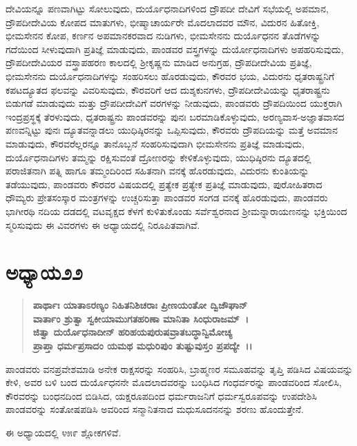 ದೇವಿಯನ್ನೂ ಪಣವಾಗಿಟ್ಟು ಸೋಲುವುದು, ದುರ್ಯೊಧನಾದಿಗಳಿಂದ ದ್ರೌಪದೀ ದೇವಿಗೆ ಸಭೆಯಲ್ಲಿ ಅಪಮಾನ, ದ್ರೌಪದೀದೇವಿಯ ಕೋಪದ ಮಾತುಗಳು, ಭೀಷ್ಮಾಚಾರ್ಯರೇ ಮೊದಲಾದವರ ಮೌನ, ವಿದುರನ ಹಿತೋಕ್ತಿ, ಭೀಮಸೇನನ ಕೋಪ, ಕರ್ಣನ ಅಪಮಾನಕರವಾದ ನುಡಿಗಳು, ಭೀಮಸೇನನು ದುರ್ಯೊಧನನ ತೊಡೆಗಳನ್ನು ಗದೆಯಿಂದ ಸೀಳುವುದಾಗಿ ಪ್ರತಿಜ್ಞೆ ಮಾಡುವುದು, ಪಾಂಡವರ ವಸ್ತ್ರಗಳನ್ನು ದುರ್ಯೋಧನಾದಿಗಳು ಅಪಹರಿಸುವುದು, ದ್ರೌಪದೀದೇವಿಯರ ವಸ್ತ್ರಾಪಹರಣ ಕಾಲದಲ್ಲಿ ಶ‍್ರೀಕೃಷ್ಣನು ಮಾಡಿದ ಅನುಗ್ರಹ, ದ್ರೌಪದೀದೇವಿಯ ಪ್ರತಿಜ್ಞೆ, ಭೀಮಸೇನನು ದುರ್ಯೊಧನಾದಿಗಳನ್ನು ಸಂಹರಿಸಲು ಹೊರಡುವುದು, ಕೌರವರ ಭಯ, ವಿದುರನು ಧೃತರಾಷ್ಟ್ರನಿಗೆ ಕಪಟ\-ದ್ಯೂತದ ಫಲವನ್ನು ವಿವರಿಸುವುದು, ಕೌರವರಿಗೆ ಆದ ದುಶ್ಶಕುನಗಳು, ದ್ರೌಪದೀದೇವಿಯನ್ನು ಧೃತರಾಷ್ಟ್ರನು ಬಿಡುಗಡೆ ಮಾಡುವುದು ಮತ್ತು ದ್ರೌಪದೀದೇವಿಗೆ ವರಗಳನ್ನು ನೀಡುವುದು, ಪಾಂಡವರು ದ್ರೌಪದಿಯಿಂದ ಯುಕ್ತರಾಗಿ ಇಂದ್ರಪ್ರಸ್ಥಕ್ಕೆ ತೆರಳುವುದು, ಧೃತರಾಷ್ಟ್ರನು ಪಾಂಡವರನ್ನು ಪುನಃ ಬರಮಾಡಿಕೊಳ್ಳುವುದು, ಅರಣ್ಯವಾಸ-ಅಜ್ಞಾತವಾಸದ ಪಣವನ್ನಿಟ್ಟು ಪುನಃ ದ್ಯೂತವನ್ನಾಡಲು ಯುಧಿಷ್ಠಿರನನ್ನು ಒಪ್ಪಿಸುವುದು, ಕೌರವರು ದ್ರೌಪದಿಯನ್ನು ಮತ್ತೆ ಅವಮಾನ ಮಾಡುವುದು, ಕೌರವರೆಲ್ಲರನ್ನೂ ತಾನೊಬ್ಬನೆ ಸಂಹರಿಸುವುದಾಗಿ ಭೀಮಸೇನನು ಪ್ರತಿಜ್ಞೆ ಮಾಡುವುದು, ದುರ್ಯೊಧನಾದಿಗಳು ತಮ್ಮನ್ನು ರಕ್ಷಿಸುವಂತೆ ದ್ರೋಣರನ್ನು ಕೇಳಿಕೊಳ್ಳುವುದು, ಯುಧಿಷ್ಠಿರನು ದ್ಯೂತದಲ್ಲಿ ಪರಾಜಿತನಾಗಿ ಪತ್ನಿ ಹಾಗೂ ತಮ್ಮಂದಿರಿಂದ ಸಹಿತನಾಗಿ ವನಕ್ಕೆ ಹೊರಡುವುದು, ವಿದುರನು ಕುಂತಿಯನ್ನು ತಡೆಯುವುದು, ಪಾಂಡವರು ಕೌರವರ ವಿಷಯದಲ್ಲಿ ಪ್ರತ್ಯೇಕ ಪ್ರತ್ಯೇಕ ಪ್ರತಿಜ್ಞೆ ಮಾಡುವುದು, ಪುರೋಹಿತರಾದ ಧೌಮ್ಯರು ಪ್ರೇತಸಂಸ್ಕಾರ ಮಂತ್ರಗಳನ್ನು ಉಚ್ಚರಿಸುತ್ತಾ ಪಾಂಡವರ ಸಂಗಡ ವನಕ್ಕೆ ಹೊರಡುವುದು, ಪಾಂಡವರು ಭಾಗೀರಥಿ ನದಿಯ ದಡದಲ್ಲಿ ವಟವೃಕ್ಷದ ಕೆಳಗೆ ಕುಳಿತುಕೊಂಡು ಸರ್ವೆಶ್ವರನಾದ ಶ‍್ರೀಮನ್ನಾರಾಯಣನನ್ನು ಭಕ್ತಿಯಿಂದ ಸ್ಮರಿಸುವುದು ಈ ವಿವರಗಳು ಈ ಅಧ್ಯಾಯದಲ್ಲಿ ನಿರೂಪಿತವಾಗಿವೆ.


\section*{ಅಧ್ಯಾಯ\enginline{-}೨೨}

\begin{verse}
\textbf{ಪಾರ್ಥಾಃ ಯಾತಾಽರಣ್ಯಂ ನಿಹಿತನಿಶಿಚರಾಃ ಪ್ರೀಣಯಂತೋ ದ್ವಿಜೌಘಾನ್}\\\textbf{ವಾರ್ತಾಂ ಶ್ರುತ್ವಾ ಸ್ವಕೀಯಾಮುಗತಹರಿಣಾ ಮಾನಿತಾ ಸಿಂಧುರಾಜಮ್~।}\\\textbf{ಜಿತ್ವಾ ದುರ್ಯೊಧನಾದೀನ್ ಹರಿಹಯಪುರುಷವ್ರಾತಬದ್ಧಾನ್ವಿಮೋಚ್ಯ}\\\textbf{ಪ್ರಾಪ್ತಾ ಧರ್ಮಪ್ರಸಾದಂ ಯಮಥ ಮಧುರಿಪುಂ ತುಷ್ಟುವುಸ್ತಂ ಪ್ರಪದ್ಯೇ~।।}
\end{verse}

ಪಾಂಡವರು ವನಪ್ರವೇಶಮಾಡಿ ಅನೇಕ ರಾಕ್ಷಸರನ್ನು ಸಂಹರಿಸಿ, ಬ್ರಾಹ್ಮಣರ ಸಮೂಹವನ್ನು ತೃಪ್ತಿ ಪಡಿಸಿದ ವಿಷಯವನ್ನು ಕೇಳಿ, ಅವರ ಬಳಿ ಬಂದ ದುರ್ಯೊಧನನೇ ಮೊದಲಾದವರನ್ನು ಬಂಧಿಸಿದ ಗಂಧರ್ವರನ್ನು ಪಾಂಡವರಿಂದ ಸೋಲಿಸಿ, ಕೌರವರನ್ನು ಬಂಧನದಿಂದ ಬಿಡಿಸಿದ, ಯಕ್ಷರೂಪದಿಂದ ಧರ್ಮರಾಜನಿಗೆ ಧರ್ಮಸ್ವರೂಪವನ್ನು ಉಪದೇಶಿಸಿ ಪಾಂಡವರನ್ನು ಸಂತೋಷಪಡಿಸಿ ಅವರಿಂದ ಸನ್ಮಾನಿತನಾದ ಮಧುಸೂದನನನ್ನು ಶರಣು ಹೊಂದುತ್ತೇನೆ.

ಈ ಅಧ್ಯಾಯದಲ್ಲಿ ೪೫೯ ಶ್ಲೋಕಗಳಿವೆ.

